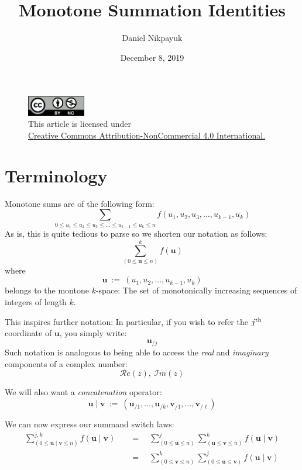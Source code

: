 \documentclass[twoside]{article}
\title{Monotone Summation Identities}
\author{Daniel Nikpayuk}
\date{December 8, 2019}
\newcommand{\bu}[1][u]{\ensuremath{\mathbf #1}}
\newcommand{\eq}{\ensuremath{\quad=\quad}}
\begin{document}
\maketitle

\begin{figure}[h]
\centering
\includegraphics[width=1in]{../../../cc-by-nc.png}\\[0.1in]
\tiny This article is licensed under \\
\href{http://creativecommons.org/licenses/by-nc/4.0/}
{Creative Commons Attribution-NonCommercial 4.0 International.}\\[0.3in]
\end{figure}

\section{Terminology}

Monotone sums are of the following form:
$$ \sum_{0\le u_1\le u_2\le u_3\le\ldots\le u_{k-1}\le u_k\le n}f(u_1, u_2, u_3,\ldots, u_{k-1}, u_k) $$
As is, this is quite tedious to parse so we shorten our notation as follows:
$$ \sum_{(0\le\bu\le n)}^k\!\!\!\!\! f(\bu)  $$
where
$$ \bu\ :=\ (u_1, u_2,\ldots, u_{k-1}, u_k)  $$
belongs to the montone $ k $-space: The set of monotonically increasing sequences of integers of length $ k $.

This inspires further notation: In particular, if you wish to refer the $ j^{\mbox{\scriptsize th}} $ coordinate
of $ \bu $, you simply write:
$$  \bu_{/j}  $$
Such notation is analogous to being able to access the \emph{real} and \emph{imaginary} components of a complex number:
$$ \mathcal{R}e(z),\ \mathcal{I}m(z) $$

We will also want a \emph{concatenation} operator:
$$  \bu \mid \bu[v]\ :=\ (\bu_{/1},\ldots ,\bu_{/k},\bu[v]_{\!/1}, \ldots ,\bu[v]_{\!/\ell})  $$

We can now express our summand switch laws:
\begin{align*}
\sum_{(0\le\bu\mid\bu[v]\le n)}^{j,k}                                       
       \!\!\!\!\!\!\! f(\bu\mid\bu[v])                                 
 &\eq \sum_{(0\le\bu\le n)}^j                                           
       \sum_{(\bu\le\bu[v]\le n)}^k\!\!\!\!\! f(\bu\mid\bu[v])     \\  
 &\eq \sum_{(0\le\bu[v]\le n)}^k                                          
       \sum_{(0\le\bu\le\bu[v])}^j\!\!\!\!\! f(\bu\mid\bu[v])      \\
\end{align*}
\end{document}
